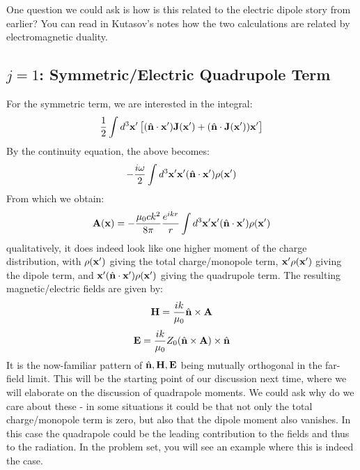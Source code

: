 One question we could ask is how is this related to the electric dipole story from earlier? You can read in Kutasov's notes how the two calculations are related by electromagnetic duality.

\subsection{$j=1$: Symmetric/Electric Quadrupole Term}
For the symmetric term, we are interested in the integral:
\begin{equation}
    \frac{1}{2}\int d^3\mathbf{x}'\left[(\hat{\mathbf{n}}\cdot\mathbf{x}')\mathbf{J}(\mathbf{x}')+ (\hat{\mathbf{n}}\cdot\mathbf{J}(\mathbf{x}'))\mathbf{x}'\right]
\end{equation}
By the continuity equation, the above becomes:
\begin{equation}
    -\frac{i\omega}{2}\int d^3\mathbf{x}'\mathbf{x}'(\hat{\mathbf{n}}\cdot\mathbf{x}')\rho(\mathbf{x}')
\end{equation}
From which we obtain:
\begin{equation}
    \mathbf{A}(\mathbf{x}) = -\frac{\mu_0ck^2}{8\pi}\frac{e^{ikr}}{r}\int d^3\mathbf{x}'\mathbf{x}'(\hat{\mathbf{n}}\cdot\mathbf{x}')\rho(\mathbf{x}')
\end{equation}
qualitatively, it does indeed look like one higher moment of the charge distribution, with $\rho(\mathbf{x}')$ giving the total charge/monopole term, $\mathbf{x}'\rho(\mathbf{x}')$ giving the dipole term, and $\mathbf{x}'(\hat{\mathbf{n}}\cdot\mathbf{x}')\rho(\mathbf{x}')$ giving the quadrupole term. The resulting magnetic/electric fields are given by:
\begin{equation}
    \mathbf{H} = \frac{ik}{\mu_0}\hat{\mathbf{n}} \times \mathbf{A}
\end{equation}
\begin{equation}
    \mathbf{E} = \frac{ik}{\mu_0}Z_0(\hat{\mathbf{n}}\times\mathbf{A})\times\hat{\mathbf{n}}
\end{equation}
It is the now-familiar pattern of $\hat{\mathbf{n}}, \mathbf{H}, \mathbf{E}$ being mutually orthogonal in the far-field limit. This will be the starting point of our discussion next time, where we will elaborate on the discussion of quadrapole moments. We could ask why do we care about these - in some situations it could be that not only the total charge/monopole term is zero, but also that the dipole moment also vanishes. In this case the quadrapole could be the leading contribution to the fields and thus to the radiation. In the problem set, you will see an example where this is indeed the case.
